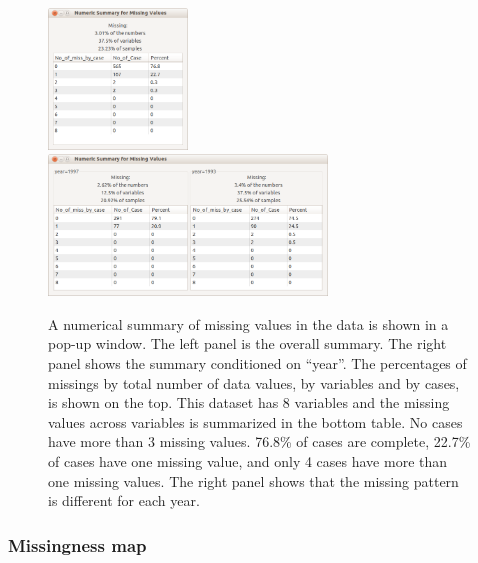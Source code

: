 \documentclass[article]{jss}
\begin{document}
\begin{center}
\begin{figure}[h]
\begin{centering}
\includegraphics[width=0.33\textwidth]{graph/fig2-summary-1}
\includegraphics[width=0.66\textwidth]{graph/fig2-summary-2-condition}
\par\end{centering}
\caption{A numerical summary of missing values in the data is shown in a pop-up window. The left panel is the overall summary. The right panel shows the summary conditioned on ``year''. The percentages of missings by total number of data values, by variables and by cases, is shown on the top. This dataset has 8 variables and the missing values across variables is summarized in the bottom table. No cases have more than 3 missing values.  76.8\% of cases are complete, 22.7\% of cases have one missing value, and only 4 cases have more than one missing values. The right panel shows that the missing pattern is different for each year.}
\label{fig: num-summry}
\end{figure}
\par\end{center}

\subsubsection{Missingness map}
\end{document}
